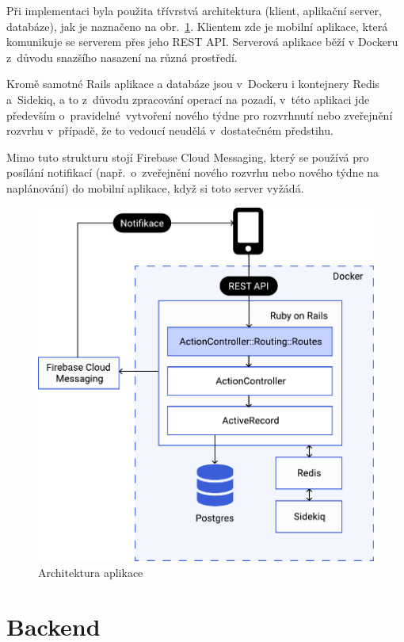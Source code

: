 \documentclass[twoside]{ctuthesis}
\begin{document}
Při implementaci byla použita třívrstvá architektura (klient, aplikační server, databáze), jak je naznačeno na obr.~\ref{fig:architecture}. Klientem zde je mobilní aplikace, která komunikuje se serverem přes jeho REST API. Serverová aplikace běží v Dockeru z~důvodu snazšího nasazení na různá prostředí.

Kromě samotné Rails aplikace a databáze jsou v~Dockeru i kontejnery Redis a~Sidekiq, a to z~důvodu zpracování operací na pozadí, v~této aplikaci jde především o~pravidelné~vytvoření nového týdne pro rozvrhnutí nebo zveřejnění rozvrhu v~případě, že to vedoucí neudělá v~dostatečném předstihu.

Mimo tuto strukturu stojí Firebase Cloud Messaging, který se používá pro posílání notifikací (např.~o~zveřejnění nového rozvrhu nebo nového týdne na naplánování) do mobilní aplikace, když si toto server vyžádá.

\begin{figure}[h]
	\includegraphics[scale=0.7]{img/architecture.pdf}
	\caption{Architektura aplikace}
	\label{fig:architecture}
\end{figure}

\section{Backend}
\end{document}
